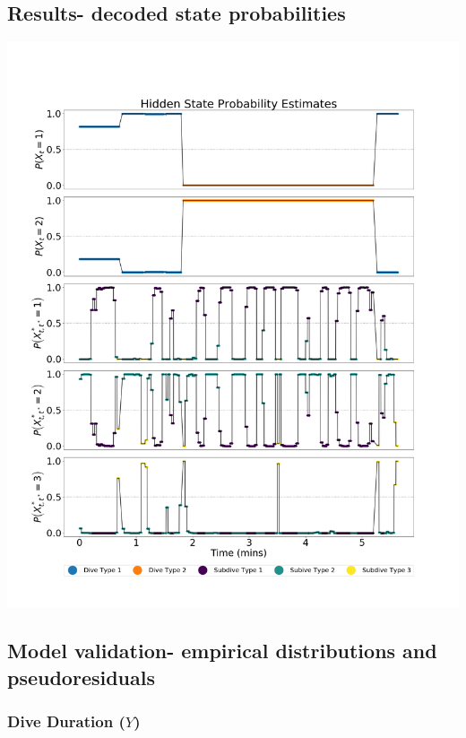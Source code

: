 \documentclass[12pt]{TD-CJS}
\begin{document}
\subsection{Results- decoded state probabilities}

\includegraphics[width=6in]{../Plots/decoded_states.png}

\newpage

\subsection{Model validation- empirical distributions and pseudoresiduals}
\subsubsection{Dive Duration ($Y$)}
\end{document}
